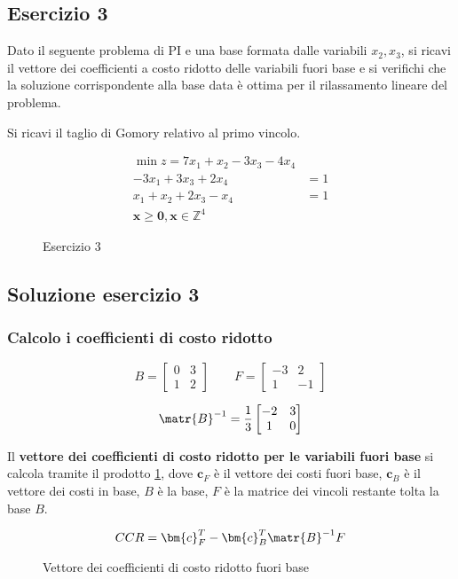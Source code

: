 \documentclass[\main/main.tex]{subfiles}
\begin{document}
\subsection{Esercizio 3}
Dato il seguente problema di PI e una base formata dalle variabili $x_2, x_3$, si ricavi il vettore dei coefficienti a costo ridotto delle variabili fuori base e si verifichi che la soluzione corrispondente alla base data è ottima per il rilassamento lineare del problema.

Si ricavi il taglio di Gomory relativo al primo vincolo.

\begin{figure}
  \begin{align*}
    \min z = 7x_1 + x_2 -3x_3 -4x_4 \\
    -3x_1 + 3x_3 +2x_4    & =1      \\
    x_1 + x_2 + 2x_3 -x_4 & =1      \\
    \bm{x}\geq \bm{0}, \bm{x} \in \mathbb{Z}^4
  \end{align*}
  \caption{Esercizio 3}
\end{figure}

\subsection{Soluzione esercizio 3}

\subsubsection*{Calcolo i coefficienti di costo ridotto}
\[
  B = \begin{bmatrix}
    0 & 3 \\
    1 & 2
  \end{bmatrix}
  \qquad
  F = \begin{bmatrix}
    -3 & 2  \\
    1  & -1
  \end{bmatrix}
\]

\[
  \matr{B}^{-1} = \frac{1}{3} \begin{bmatrix}
    -2 & 3 \\
    1  & 0
  \end{bmatrix}
\]

\begin{definition}
  Il \textbf{vettore dei coefficienti di costo ridotto per le variabili fuori base} si calcola tramite il prodotto \ref{vccr}, dove $\bm{c}_F$ è il vettore dei costi fuori base, $\bm{c}_B$ è il vettore dei costi in base, $B$ è la base, $F$ è la matrice dei vincoli restante tolta la base $B$.
  \begin{figure}
    \[
      CCR = \bm{c}_F^T - \bm{c}_B^T \matr{B}^{-1} F
    \]
    \caption{Vettore dei coefficienti di costo ridotto fuori base}
    \label{vccr}
  \end{figure}
\end{definition}
\end{document}
